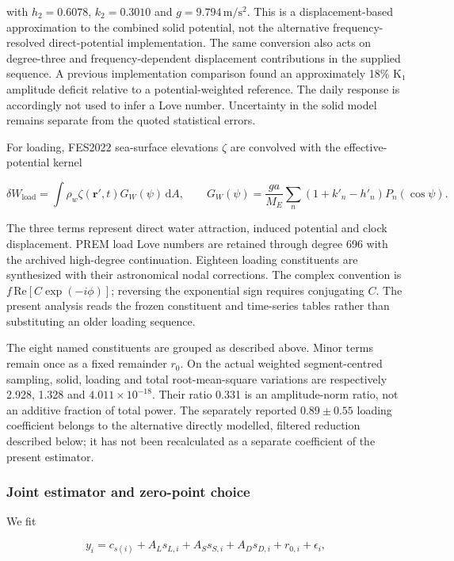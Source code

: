 \documentclass[
  10pt,
  a4paper,
]{article}
\begin{document}
with \(h_2=0.6078\), \(k_2=0.3010\) and \(g=9.794\,\mathrm{m/s^2}\).
This is a displacement-based approximation to the combined solid
potential, not the alternative frequency-resolved direct-potential
implementation. The same conversion also acts on degree-three and
frequency-dependent displacement contributions in the supplied sequence.
A previous implementation comparison found an approximately 18\% K₁
amplitude deficit relative to a potential-weighted reference. The daily
response is accordingly not used to infer a Love number. Uncertainty in
the solid model remains separate from the quoted statistical errors.

For loading, FES2022 sea-surface elevations \(\zeta\) are convolved with
the effective-potential kernel

\[\delta W_{\mathrm{load}}=\int \rho_w\zeta(\mathbf{r}',t)G_W(\psi)\,\mathrm{d}A,\qquad
G_W(\psi)=\frac{ga}{M_E}\sum_n(1+k'_n-h'_n)P_n(\cos\psi).\]

The three terms represent direct water attraction, induced potential and
clock displacement. PREM load Love numbers are retained through degree
696 with the archived high-degree continuation. Eighteen loading
constituents are synthesized with their astronomical nodal corrections.
The complex convention is \(f\,\mathrm{Re}[C\exp(-i\phi)]\); reversing
the exponential sign requires conjugating \(C\). The present analysis
reads the frozen constituent and time-series tables rather than
substituting an older loading sequence.

The eight named constituents are grouped as described above. Minor terms
remain once as a fixed remainder \(r_0\). On the actual weighted
segment-centred sampling, solid, loading and total root-mean-square
variations are respectively 2.928, 1.328 and \(4.011\times10^{-18}\).
Their ratio 0.331 is an amplitude-norm ratio, not an additive fraction
of total power. The separately reported \(0.89\pm0.55\) loading
coefficient belongs to the alternative directly modelled, filtered
reduction described below; it has not been recalculated as a separate
coefficient of the present estimator.

\hypertarget{joint-estimator-and-zero-point-choice}{%
\subsubsection{Joint estimator and zero-point
choice}\label{joint-estimator-and-zero-point-choice}}

We fit

\[y_i=c_{s(i)}+A_Ls_{L,i}+A_Ss_{S,i}+A_Ds_{D,i}+r_{0,i}+\epsilon_i,\]
\end{document}
